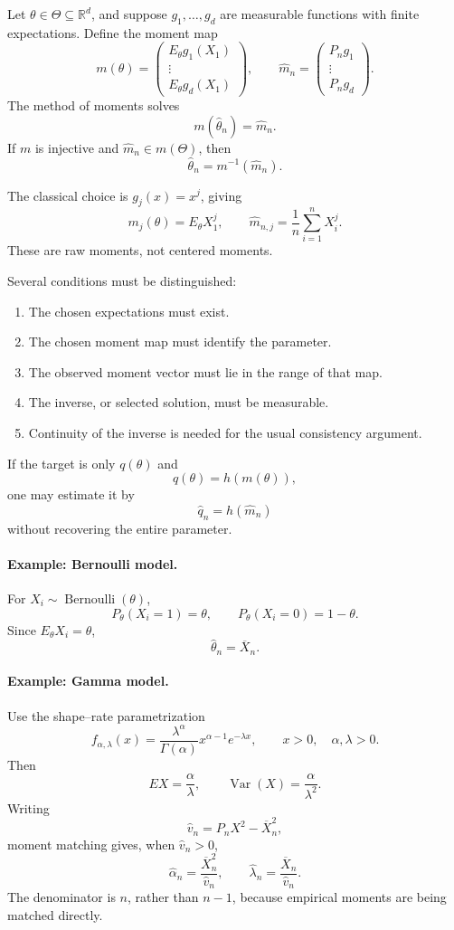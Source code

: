 Let $\theta\in\Theta\subseteq\mathbb R^d$, and suppose
$g_1,\ldots,g_d$ are measurable functions with finite expectations.
Define the moment map
\[
m(\theta)=
\begin{pmatrix}
E_\theta g_1(X_1)\\
\vdots\\
E_\theta g_d(X_1)
\end{pmatrix},
\qquad
\widehat m_n=
\begin{pmatrix}
P_ng_1\\
\vdots\\
P_ng_d
\end{pmatrix}.
\]
The method of moments solves
\[
m(\widehat\theta_n)=\widehat m_n.
\]
If $m$ is injective and $\widehat m_n\in m(\Theta)$, then
\[
\widehat\theta_n=m^{-1}(\widehat m_n).
\]

The classical choice is $g_j(x)=x^j$, giving
\[
m_j(\theta)=E_\theta X_1^j,
\qquad
\widehat m_{n,j}=\frac1n\sum_{i=1}^nX_i^j.
\]
These are raw moments, not centered moments.

Several conditions must be distinguished:
\begin{enumerate}
\item The chosen expectations must exist.
\item The chosen moment map must identify the parameter.
\item The observed moment vector must lie in the range of that map.
\item The inverse, or selected solution, must be measurable.
\item Continuity of the inverse is needed for the usual consistency
argument.
\end{enumerate}

If the target is only $q(\theta)$ and
\[
q(\theta)=h(m(\theta)),
\]
one may estimate it by
\[
\widehat q_n=h(\widehat m_n)
\]
without recovering the entire parameter.

\paragraph{Example: Bernoulli model.}
For $X_i\sim\operatorname{Bernoulli}(\theta)$,
\[
P_\theta(X_i=1)=\theta,
\qquad
P_\theta(X_i=0)=1-\theta.
\]
Since $E_\theta X_i=\theta$,
\[
\widehat\theta_n=\overline X_n.
\]

\paragraph{Example: Gamma model.}
Use the shape--rate parametrization
\[
f_{\alpha,\lambda}(x)
=
\frac{\lambda^\alpha}{\Gamma(\alpha)}
x^{\alpha-1}e^{-\lambda x},
\qquad x>0,\quad \alpha,\lambda>0.
\]
Then
\[
EX=\frac{\alpha}{\lambda},
\qquad
\operatorname{Var}(X)=\frac{\alpha}{\lambda^2}.
\]
Writing
\[
\widehat v_n=P_nX^2-\overline X_n^2,
\]
moment matching gives, when $\widehat v_n>0$,
\[
\widehat\alpha_n=\frac{\overline X_n^2}{\widehat v_n},
\qquad
\widehat\lambda_n=\frac{\overline X_n}{\widehat v_n}.
\]
The denominator is $n$, rather than $n-1$, because empirical
moments are being matched directly.

